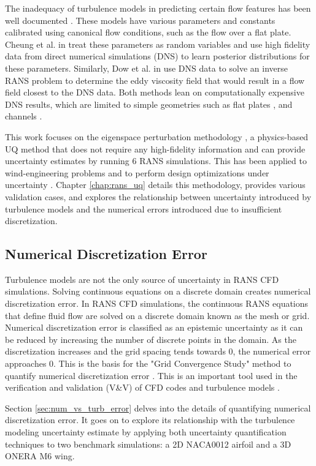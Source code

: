 The inadequacy of turbulence models in predicting certain flow features has been well documented \cite{slotnick_cfd_nodate}.
These models have various parameters and constants calibrated using canonical flow conditions, such as the flow over a flat plate. 
Cheung et al. in \cite{cheung2011bayesian} treat these parameters as random variables and use high fidelity data from direct numerical simulations (DNS) to learn posterior distributions for these parameters. 
Similarly, Dow et al. in \cite{dow2011quantification} use DNS data to solve an inverse RANS problem to determine the eddy viscosity field that would result in a flow field closest to the DNS data. 
Both methods lean on computationally expensive DNS results, which are limited to simple geometries such as flat plates \cite{hoyas_reynolds_2008}, and channels \cite{laval_marquillie_dns_channel,marquillie_instability_2011}.

This work focuses on the eigenspace perturbation methodology \cite{emory2013modeling,iaccarino_eig_pert}, a physics-based UQ method that does not require any high-fidelity information and can provide uncertainty estimates by running 6 RANS simulations.
This has been applied to wind-engineering problems \cite{gorle2015quantifying} and to perform design optimizations under uncertainty \cite{mishra2020design}.
Chapter \ref{chap:rans_uq} details this methodology, provides various validation cases, and explores the relationship between uncertainty introduced by turbulence models and the numerical errors introduced due to insufficient discretization. 

\subsection{Numerical Discretization Error}

Turbulence models are not the only source of uncertainty in RANS CFD simulations.
Solving continuous equations on a discrete domain creates numerical discretization error.
In RANS CFD simulations, the continuous RANS equations that define fluid flow are solved on a discrete domain known as the mesh or grid.
Numerical discretization error is classified as an epistemic uncertainty as it can be reduced by increasing the number of discrete points in the domain.
As the discretization increases and the grid spacing tends towards $0$, the numerical error approaches $0$. 
This is the basis for the "Grid Convergence Study" method to quantify numerical discretization error \cite{american_society_of_mechanical_engineers_standard_2009}.
This is an important tool used in the verification and validation (V\&V) of CFD codes and turbulence models \cite{rumsey2010description}.

Section \ref{sec:num_vs_turb_error} delves into the details of quantifying numerical discretization error. 
It goes on to explore its relationship with the turbulence modeling uncertainty estimate by applying both uncertainty quantification techniques to two benchmark simulations: a 2D NACA0012 airfoil and a 3D ONERA M6 wing.
